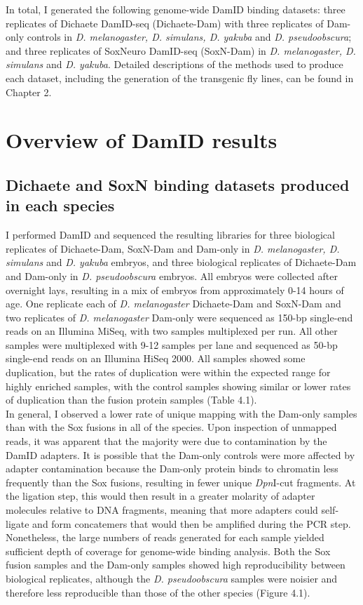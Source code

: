 In total, I generated the following genome-wide DamID binding datasets: three replicates of Dichaete DamID-seq (Dichaete-Dam) with three replicates of Dam-only controls in \emph{D. melanogaster, D. simulans, D. yakuba} and \emph{D. pseudoobscura}; and three replicates of SoxNeuro DamID-seq (SoxN-Dam) in \emph{D. melanogaster, D. simulans} and \emph{D. yakuba}. Detailed descriptions of the methods used to produce each dataset, including the generation of the transgenic fly lines, can be found in Chapter 2.

\section{Overview of DamID results}
\subsection{Dichaete and SoxN binding datasets produced in each species}
I performed DamID and sequenced the resulting libraries for three biological replicates of Dichaete-Dam, SoxN-Dam and Dam-only in \emph{D. melanogaster, D. simulans} and \emph{D. yakuba} embryos, and three biological replicates of Dichaete-Dam and Dam-only in \emph{D. pseudoobscura} embryos. All embryos were collected after overnight lays, resulting in a mix of embryos from approximately 0-14 hours of age. One replicate each of \emph{D. melanogaster} Dichaete-Dam and SoxN-Dam and two replicates of \emph{D. melanogaster} Dam-only were sequenced as 150-bp single-end reads on an Illumina MiSeq, with two samples multiplexed per run. All other samples were multiplexed with 9-12 samples per lane and sequenced as 50-bp single-end reads on an Illumina HiSeq 2000. All samples showed some duplication, but the rates of duplication were within the expected range for highly enriched samples, with the control samples showing similar or lower rates of duplication than the fusion protein samples (Table 4.1).\\

In general, I observed a lower rate of unique mapping with the Dam-only samples than with the Sox fusions in all of the species. Upon inspection of unmapped reads, it was apparent that the majority were due to contamination by the DamID adapters. It is possible that the Dam-only controls were more affected by adapter contamination because the Dam-only protein binds to chromatin less frequently than the Sox fusions, resulting in fewer unique \emph{Dpn}I-cut fragments. At the ligation step, this would then result in a greater molarity of adapter molecules relative to DNA fragments, meaning that more adapters could self-ligate and form concatemers that would then be amplified during the PCR step. Nonetheless, the large numbers of reads generated for each sample yielded sufficient depth of coverage for genome-wide binding analysis. Both the Sox fusion samples and the Dam-only samples showed high reproducibility between biological replicates, although the \emph{D. pseudoobscura} samples were noisier and therefore less reproducible than those of the other species (Figure 4.1).\\ 


